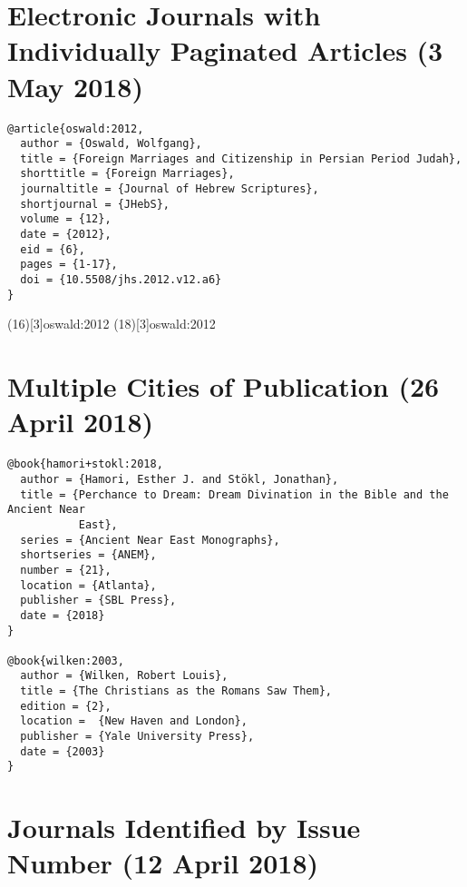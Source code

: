 \documentclass[a4paper]{article}
\begin{document}
\section{Electronic Journals with Individually Paginated Articles (3 May 2018)}

\begin{verbatim}
@article{oswald:2012,
  author = {Oswald, Wolfgang},
  title = {Foreign Marriages and Citizenship in Persian Period Judah},
  shorttitle = {Foreign Marriages},
  journaltitle = {Journal of Hebrew Scriptures},
  shortjournal = {JHebS},
  volume = {12},
  date = {2012},
  eid = {6},
  pages = {1-17},
  doi = {10.5508/jhs.2012.v12.a6}
}
\end{verbatim}

\examplecite(16)[3]{oswald:2012}
\examplecite(18)[3]{oswald:2012}
\exampleabbreviations
\examplebibliography
{}

\section{Multiple Cities of Publication (26 April 2018)}

\begin{verbatim}
@book{hamori+stokl:2018,
  author = {Hamori, Esther J. and Stökl, Jonathan},
  title = {Perchance to Dream: Dream Divination in the Bible and the Ancient Near
           East},
  series = {Ancient Near East Monographs},
  shortseries = {ANEM},
  number = {21},
  location = {Atlanta},
  publisher = {SBL Press},
  date = {2018}
}

@book{wilken:2003,
  author = {Wilken, Robert Louis},
  title = {The Christians as the Romans Saw Them},
  edition = {2},
  location =  {New Haven and London},
  publisher = {Yale University Press},
  date = {2003}
}
\end{verbatim}

\exampleabbreviations
\examplebibliography
{}

\section{Journals Identified by Issue Number (12 April 2018)}
\end{document}

